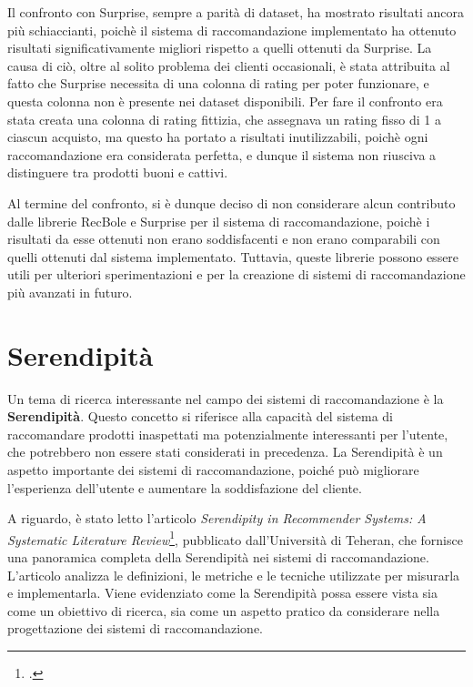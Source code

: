 Il confronto con Surprise, sempre a parità di dataset, ha mostrato risultati ancora più schiaccianti, poichè il sistema di raccomandazione implementato ha ottenuto risultati significativamente migliori rispetto a quelli ottenuti da Surprise. La causa di ciò, oltre al solito problema dei clienti occasionali, è stata attribuita al fatto che Surprise necessita di una colonna di rating per poter funzionare, e questa colonna non è presente nei dataset disponibili. Per fare il confronto era stata creata una colonna di rating fittizia, che assegnava un rating fisso di 1 a ciascun acquisto, ma questo ha portato a risultati inutilizzabili, poichè ogni raccomandazione era considerata perfetta, e dunque il sistema non riusciva a distinguere tra prodotti buoni e cattivi.

Al termine del confronto, si è dunque deciso di non considerare alcun contributo dalle librerie RecBole e Surprise per il sistema di raccomandazione, poichè i risultati da esse ottenuti non erano soddisfacenti e non erano comparabili con quelli ottenuti dal sistema implementato. Tuttavia, queste librerie possono essere utili per ulteriori sperimentazioni e per la creazione di sistemi di raccomandazione più avanzati in futuro.


\section{Serendipità}

Un tema di ricerca interessante nel campo dei sistemi di raccomandazione è la \textbf{Serendipità}. Questo concetto si riferisce alla capacità del sistema di raccomandare prodotti inaspettati ma potenzialmente interessanti per l'utente, che potrebbero non essere stati considerati in precedenza. La Serendipità è un aspetto importante dei sistemi di raccomandazione, poiché può migliorare l'esperienza dell'utente e aumentare la soddisfazione del cliente.

A riguardo, è stato letto l'articolo \emph{Serendipity in Recommender Systems: A Systematic Literature Review}\footcite{article:serendipity-recommender-systems}, pubblicato dall'Università di Teheran, che fornisce una panoramica completa della Serendipità nei sistemi di raccomandazione. L'articolo analizza le definizioni, le metriche e le tecniche utilizzate per misurarla e implementarla. Viene evidenziato come la Serendipità possa essere vista sia come un obiettivo di ricerca, sia come un aspetto pratico da considerare nella progettazione dei sistemi di raccomandazione.

